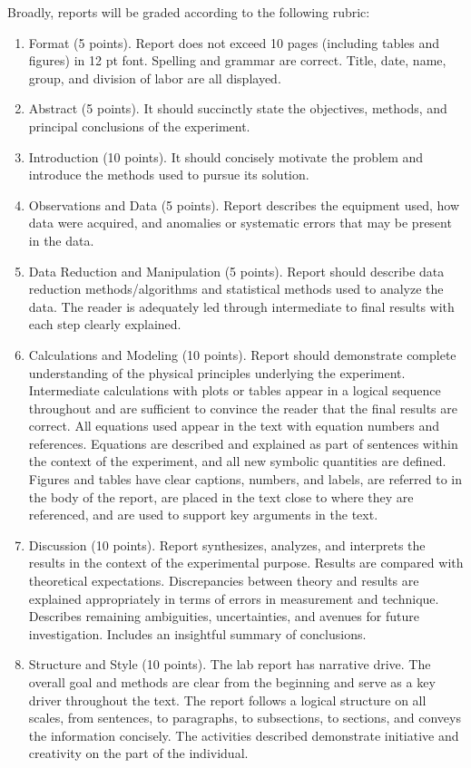 \documentclass[12pt,preprint]{aastex}
\begin{document}
 \noindent
 Broadly, reports will be graded according to the following rubric:
 \begin{enumerate}
     \item Format (5 points). Report does not exceed 10 pages (including tables and figures) in 12 pt font. Spelling and grammar are correct. Title, date, name, group, and division of labor are all displayed.
     \item Abstract (5 points). It should succinctly state the objectives, methods, and principal conclusions of the experiment.
     \item Introduction (10 points). It should concisely motivate the problem and introduce the methods used to pursue its solution.
     \item Observations and Data (5 points). Report describes the equipment used, how data were acquired, and anomalies or systematic errors that may be present in the data.
     \item Data Reduction and Manipulation (5 points). Report should describe data reduction methods/algorithms and statistical methods used to analyze the data. The reader is adequately led through intermediate to final results with each step clearly explained.
     \item Calculations and Modeling (10 points). Report should demonstrate complete understanding of the physical principles underlying the experiment. Intermediate calculations with plots or tables appear in a logical sequence throughout and are sufficient to convince the reader that the final results are correct. All equations used appear in the text with equation numbers and references. Equations are described and explained as part of sentences within the context of the experiment, and all new symbolic quantities are defined. Figures and tables have clear captions, numbers, and labels, are referred to in the body of the report, are placed in the text close to where they are referenced, and are used to support key arguments in the text.
     \item Discussion (10 points). Report synthesizes, analyzes, and interprets the results in the context of the experimental purpose. Results are compared with theoretical expectations. Discrepancies between theory and results are explained appropriately in terms of errors in measurement and technique. Describes remaining ambiguities, uncertainties, and avenues for future investigation. Includes an insightful summary of conclusions.
     \item Structure and Style (10 points). The lab report has narrative drive. The overall goal and methods are clear from the beginning and serve as a key driver throughout the text. The report follows a logical structure on all scales, from sentences, to paragraphs, to subsections, to sections, and conveys the  information concisely. The activities described demonstrate initiative and creativity on the part of the individual. 
 \end{enumerate}
\end{document}
